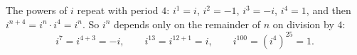 The powers of $i$ repeat with period $4$: $i^1=i$, $i^2=-1$, $i^3=-i$, $i^4=1$, and then $i^{n+4}=i^n\cdot i^4=i^n$. So $i^n$ depends only on the remainder of $n$ on division by $4$:
\[i^7=i^{4+3}=\boxed{-i},\qquad i^{13}=i^{12+1}=\boxed{i},\qquad i^{100}=\left(i^4\right)^{25}=\boxed{1}.\]
